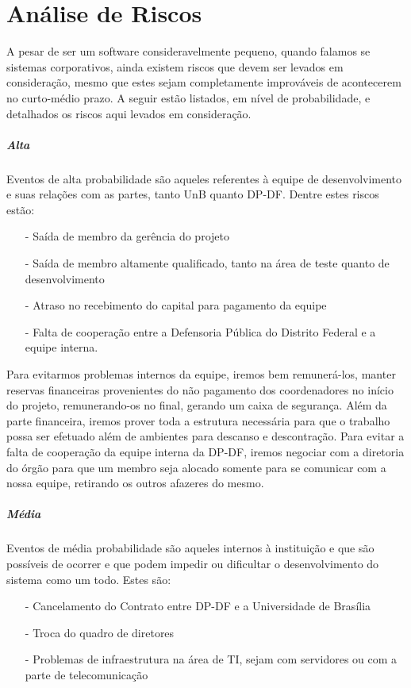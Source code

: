 \documentclass[12pt,a4paper]{report}
\begin{document}
\chapter{Análise de Riscos}

A pesar de ser um software consideravelmente pequeno, quando falamos se sistemas corporativos, ainda existem riscos que devem ser levados em consideração, mesmo que estes sejam completamente improváveis de acontecerem no curto-médio prazo. A seguir estão listados, em nível de probabilidade, e detalhados os riscos aqui levados em consideração.

\paragraph{Alta} Eventos de alta probabilidade são aqueles referentes à equipe de desenvolvimento e suas relações com as partes, tanto UnB quanto DP-DF. Dentre estes riscos estão:

\begin{itemize}
\item [-] Saída de membro da gerência do projeto
\item [-] Saída de membro altamente qualificado, tanto na área de teste quanto de desenvolvimento
\item [-] Atraso no recebimento do capital para pagamento da equipe
\item [-] Falta de cooperação entre a Defensoria Pública do Distrito Federal e a equipe interna.
\end{itemize}

Para evitarmos problemas internos da equipe, iremos bem remunerá-los, manter reservas financeiras provenientes do não pagamento dos coordenadores no início do projeto, remunerando-os no final, gerando um caixa de segurança. Além da parte financeira, iremos prover toda a estrutura necessária para que o trabalho possa ser efetuado além de ambientes para descanso e descontração. Para evitar a falta de cooperação da equipe interna da DP-DF, iremos negociar com a diretoria do órgão para que um membro seja alocado somente para se comunicar com a nossa equipe, retirando os outros afazeres do mesmo.

\paragraph{Média} Eventos de média probabilidade são aqueles internos à instituição e que são possíveis de ocorrer e que podem impedir ou dificultar o desenvolvimento do sistema como um todo. Estes são:
\begin{itemize}
\item [-] Cancelamento do Contrato entre DP-DF e a Universidade de Brasília
\item [-] Troca do quadro de diretores
\item [-] Problemas de infraestrutura na área de TI, sejam com servidores ou com a parte de telecomunicação
\end{itemize}
\end{document}
